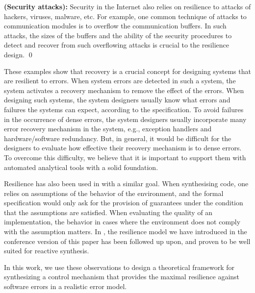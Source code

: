 \begin{example} {\bf (Security attacks):}
\label{exmp.satt}
Security in the Internet also relies on resilience to attacks of hackers, viruses, malware, etc.  
For example, one common technique of attacks to communication modules is to overflow the communication buffers.  
In such attacks, the sizes of the buffers and the ability of the security procedures to detect and recover from such overflowing attacks is crucial to the resilience design.  
\qed 
\end{example} 

These examples show that recovery is a crucial concept for designing systems that are resilient to errors. 
When system errors are detected in such a system, the system activates a recovery mechanism to remove the effect of the errors.
When designing such systems, the system designers usually know what errors and failures the systems can expect, according to the specification.
To avoid failures in the occurrence of dense errors, the system designers usually incorporate many error recovery mechanism in the system, e.g., exception handlers and hardware/software redundancy. 
But, in general, it would be difficult for the designers to evaluate how effective their recovery mechanism is to dense errors.
To overcome this difficulty, we believe that it is important to support them with automated analytical tools with a solid foundation.

Resilience has also been used in \cite{EhlersT14,BloemEJK14} with a similar goal.
When synthesising code, one relies on assumptions of the behavior of the environment, and the formal specification would only ask for the provision of guarantees under the condition that the assumptions are satisfied.
When evaluating the quality of an implementation, the behavior in cases where the environment does not comply with the assumption matters.
In \cite{EhlersT14,BloemEJK14}, the resilience model we have introduced in the conference version \cite{HPSW/12/rapidRecovery} of this paper has been followed up upon, and proven to be well suited for reactive synthesis.

In this work, we use these observations to design a theoretical framework for synthesizing a control mechanism that provides the maximal resilience against software errors in a realistic error model.

 